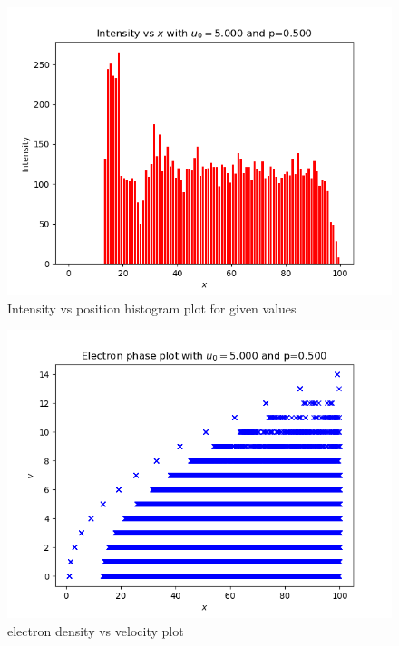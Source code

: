 \documentclass[11pt]{article}
\begin{document}
\begin{figure}[H]
    \centering
    \includegraphics[scale = 1]{2_b.png}
    \caption{Intensity vs position histogram plot for given values}
\end{figure}

\begin{figure}[H]
    \centering
    \includegraphics[scale = 1]{2_c.png}
    \caption{electron density vs velocity plot}
\end{figure}
\end{document}
